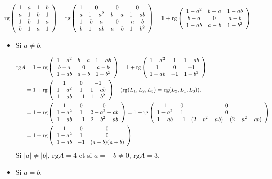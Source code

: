 {{\begin{align*}\ensuremath
\mbox{rg}\left(
\begin{array}{cccc}
1&a&1&b\\
a&1&b&1\\
1&b&1&a\\
b&1&a&1
\end{array}
\right)&=\mbox{rg}\left(
\begin{array}{cccc}
1&0&0&0\\
a&1-a^2&b-a&1-ab\\
1&b-a&0&a-b\\
b&1-ab&a-b&1-b^2
\end{array}
\right)=1+\mbox{rg}\left(
\begin{array}{ccc}
1-a^2&b-a&1-ab\\
b-a&0&a-b\\
1-ab&a-b&1-b^2
\end{array}
\right)
\end{align*}

\begin{itemize}
\item[1er cas.] Si $a\neq b$.

\begin{align*}\ensuremath
\mbox{rg}A&=1+\mbox{rg}\left(
\begin{array}{ccc}
1-a^2&b-a&1-ab\\
b-a&0&a-b\\
1-ab&a-b&1-b^2
\end{array}
\right)=1+\mbox{rg}\left(
\begin{array}{ccc}
1-a^2&1&1-ab\\
1&0&-1\\
1-ab&-1&1-b^2
\end{array}
\right)
\\
 &=1+\mbox{rg}\left(
\begin{array}{ccc}
1&0&-1\\
1-a^2&1&1-ab\\
1-ab&-1&1-b^2
\end{array}
\right)\quad(\mbox{rg}(L_1,L_2,L_3)=\mbox{rg}(L_2,L_1,L_3)).
\\
 &=1+\mbox{rg}\left(
\begin{array}{ccc}
1&0&0\\
1-a^2&1&2-a^2-ab\\
1-ab&-1&2-b^2-ab
\end{array}
\right)=1+\mbox{rg}\left(
\begin{array}{ccc}
1&0&0\\
1-a^2&1&0\\
1-ab&-1&(2-b^2-ab)-(2-a^2-ab)
\end{array}
\right)
\\
 &=1+\mbox{rg}\left(
\begin{array}{ccc}
1&0&0\\
1-a^2&1&0\\
1-ab&-1&(a-b)(a+b)
\end{array}
\right)
\end{align*}
Si $|a|\neq|b|$, $\mbox{rg}A=4$ et si $a=-b\neq0$, $\mbox{rg}A=3$.
\item[2ème cas.] Si $a=b$.


\end{itemize}}}
